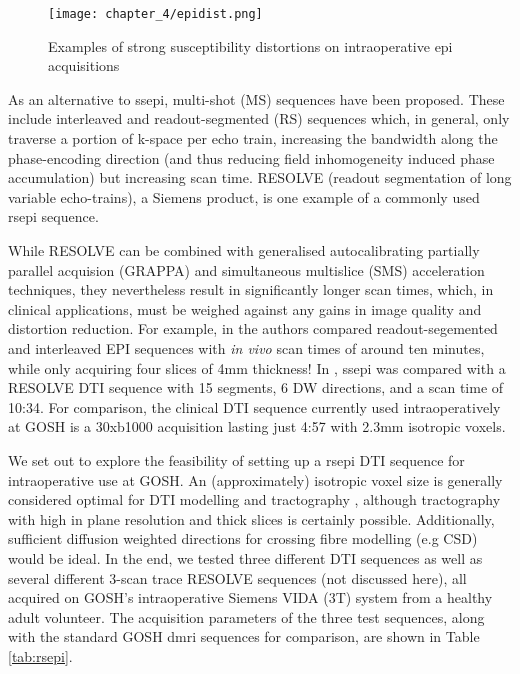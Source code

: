 \begin{figure}[h!]
  \texttt{[image: chapter\_4/epidist.png]}
  \caption{Examples of strong susceptibility distortions on intraoperative \gls{epi} acquisitions}
  \label{fig:epi}
\end{figure}

As an alternative to \gls{ssepi}, multi-shot (MS) sequences have been proposed.
These include interleaved and readout-segmented (RS) sequences which, in general, only traverse a portion of k-space per echo train, increasing the bandwidth along the phase-encoding direction (and thus reducing field inhomogeneity induced phase accumulation) but increasing scan time.\autocite{Wang2018}
RESOLVE (readout segmentation of long variable echo-trains), a Siemens product, is one example of a commonly used \gls{rsepi} sequence.

While RESOLVE can be combined with generalised autocalibrating partially parallel acquision (GRAPPA) and simultaneous multislice (SMS) acceleration techniques, they nevertheless result in significantly longer scan times, which, in clinical applications, must be weighed against any gains in image quality and distortion reduction.
For example, in \textcite{Wang2018} the authors compared readout-segemented and interleaved EPI sequences with \textit{in vivo} scan times of around ten minutes, while only acquiring four slices of 4mm thickness!
In \textcite{Elliott2020}, \gls{ssepi} was compared with a RESOLVE DTI sequence with 15 segments, 6 DW directions, and a scan time of 10:34.
For comparison, the clinical DTI sequence currently used intraoperatively at GOSH is a 30xb1000 acquisition lasting just 4:57 with 2.3mm isotropic voxels.

We set out to explore the feasibility of setting up a \gls{rsepi} DTI sequence for intraoperative use at GOSH.
An (approximately) isotropic voxel size is generally considered optimal for DTI modelling and tractography \autocite{Vos2011, Neher2013}, although tractography with high in plane resolution and thick slices is certainly possible.
Additionally, sufficient diffusion weighted directions for crossing fibre modelling (e.g CSD) would be ideal.
In the end, we tested three different DTI sequences as well as several different 3-scan trace RESOLVE sequences (not discussed here), all acquired on GOSH’s intraoperative Siemens VIDA (3T) system from a healthy adult volunteer.
The acquisition parameters of the three test sequences, along with the standard GOSH \gls{dmri} sequences for comparison, are shown in Table \ref{tab:rsepi}.

